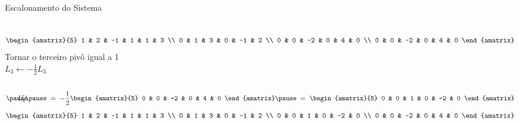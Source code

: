 \begin{resolution}{Escalonamento do Sistema}
\begin{columns}
  \[
    \begin{amatrix}{5}
      1 & 2 & -1 & 1 & 1  & 3 \\
      0 & 1 & 3  & 0 & -1 & 2 \\
      0 & 0 & -2 & 0 & 4  & 0 \\
      0 & 0 & -2 & 0 & 4  & 0
    \end{amatrix}
  \]
  \pause
{}
  Tornar o terceiro pivô igual a 1
  \\ \pause
  \(
    L_3 \leftarrow -\frac{1}{2}L_3
  \)
\end{columns}
\vspace{-\baselineskip}
\[
  \pause
  \hspace{-1.5em}
  L'_3
  \pause
  \;=\;
  -\frac{1}{2}
  \begin{amatrix}{5}
    0 & 0 & -2 & 0 & 4  & 0
  \end{amatrix}
  \pause
  \;=\;
  \begin{amatrix}{5}
    0 & 0 & 1  & 0 & -2 & 0
  \end{amatrix}
\]
\pause
\[
  \begin{amatrix}{5}
    1 & 2 & -1 & 1 & 1  & 3 \\
    0 & 1 & 3  & 0 & -1 & 2 \\
    0 & 0 & 1  & 0 & -2 & 0 \\
    0 & 0 & -2 & 0 & 4  & 0
  \end{amatrix}
\]
\end{resolution}

